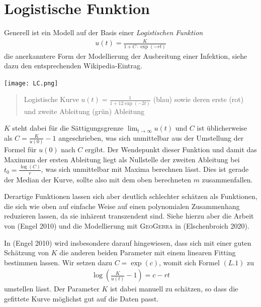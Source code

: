 \documentclass[a4paper,11pt]{article}
\newcommand{\br}[1]{\left(#1\right)}
\newcommand{\m}{\cdot}
\begin{document}
\section{Logistische Funktion}

Generell ist ein Modell auf der Basis einer \emph{Logistischen Funktion}
\begin{gather*}
  u(t)=\frac{K}{1+C\m\exp(-rt)}\tag{L.1}
\end{gather*}
die anerkanntere Form der Modellierung der Ausbreitung einer Infektion, siehe
dazu den entsprechenden Wikipedia-Eintrag. 
\begin{center}
  \texttt{[image: LC.png]}\\[1em]
  \begin{quote}
    {Logistische Kurve $u(t)=\frac{1}{1+12\exp(-2t)}$ (blau) sowie deren erste
      (rot) und zweite Ableitung (grün) Ableitung}
  \end{quote}
\end{center}
$K$ steht dabei für die Sättigungsgrenze $\lim_{t\to\infty}{u(t)}$ und $C$ ist
üblicherweise als $C=\frac{K}{u(0)}-1$ angeschrieben, was sich unmittelbar aus
der Umstellung der Formel für $u(0)$ nach $C$ ergibt. Der Wendepunkt dieser
Funktion und damit das Maximum der ersten Ableitung liegt als Nullstelle der
zweiten Ableitung bei $t_0=\frac{\log(C)}{r}$, was sich unmittelbar mit Maxima
berechnen lässt.  Dies ist gerade der Median der Kurve, sollte also mit dem
oben berechneten $m$ zusammenfallen.  

Derartige Funktionen lassen sich aber deutlich schlechter schätzen als
Funktionen, die sich wie oben auf einfache Weise auf einen polynomialen
Zusammenhang reduzieren lassen, da sie inhärent transzendent sind.  Siehe
hierzu aber die Arbeit von (Engel 2010) und die Modellierung mit
\textsc{GeoGebra} in (Elschenbroich 2020).

In (Engel 2010) wird insbesondere darauf hingewiesen, dass sich mit einer
guten Schätzung von $K$ die anderen beiden Parameter mit einem linearen
Fitting bestimmen lassen. Wir setzen dazu $C=\exp(c)$, womit sich Formel
$(L.1)$ zu
\begin{gather*}
  \log\br{\frac{K}{u(t)}-1}=c-rt  \tag{L.2}
\end{gather*}
umstellen lässt.  Der Parameter $K$ ist dabei manuell zu schätzen, so dass die
gefittete Kurve möglichst gut auf die Daten passt.
\end{document}
